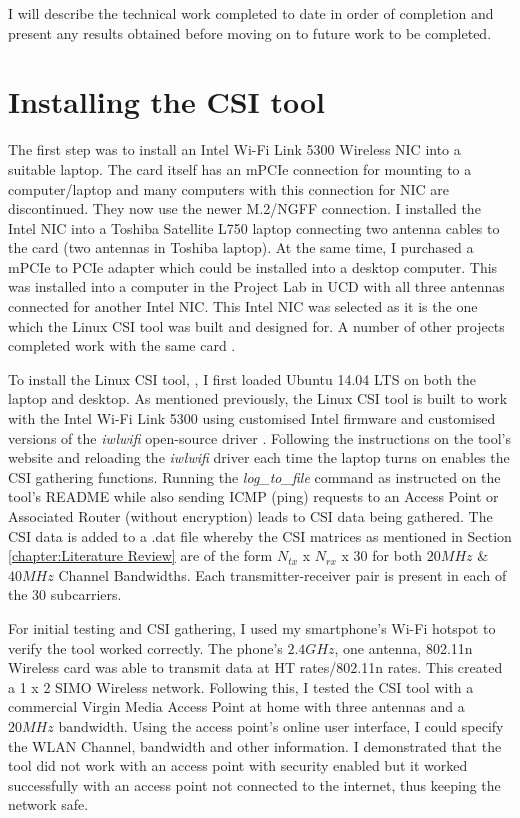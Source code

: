 I will describe the technical work completed to date in order of completion and present any results obtained before moving on to future work to be completed. 
\section{Installing the CSI tool}
The first step was to install an Intel Wi-Fi Link 5300 Wireless NIC into a suitable laptop. The card itself has an mPCIe connection for mounting to a computer/laptop and many computers with this connection for NIC are discontinued. They now use the newer M.2/NGFF connection. I installed the Intel NIC into a Toshiba Satellite L750 laptop connecting two antenna cables to the card (two antennas in Toshiba laptop). At the same time, I purchased a mPCIe to PCIe adapter which could be installed into a desktop computer. This was installed into a computer in the Project Lab in UCD with all three antennas connected for another Intel NIC. This Intel NIC was selected as it is the one which the Linux CSI tool was built and designed for. A number of other projects completed work with the same card \citep{Halperin_csitool}. \par
To install the Linux CSI tool, \cite{Halperin_csitool}, I first loaded Ubuntu 14.04 LTS on both the laptop and desktop. As mentioned previously, the Linux CSI tool is built to work with the Intel Wi-Fi Link 5300 using customised Intel firmware and customised versions of the \textit{iwlwifi} open-source driver \citep{Halperin_csitool}. Following the instructions on the tool's website and reloading the \textit{iwlwifi} driver each time the laptop turns on enables the CSI gathering functions. Running the \textit{log\_to\_file} command as instructed on the tool's README while also sending ICMP (ping) requests to an Access Point or Associated Router (without encryption) leads to CSI data being gathered. The CSI data is added to a .dat file whereby the CSI matrices as mentioned in Section \ref{chapter:Literature Review} are of the form $N_{tx}$ x $N_{rx}$ x 30 for both $20MHz$ \& $40MHz$ Channel Bandwidths. Each transmitter-receiver pair is present in each of the 30 subcarriers. \par
For initial testing and CSI gathering, I used my smartphone's Wi-Fi hotspot to verify the tool worked correctly. The phone's $2.4GHz$, one antenna, 802.11n Wireless card was able to transmit data at HT rates/802.11n rates. This created a 1 x 2 SIMO Wireless network. Following this, I tested the CSI tool with a commercial Virgin Media Access Point at home with three antennas and a $20MHz$ bandwidth. Using the access point's online user interface, I could specify the WLAN Channel, bandwidth and other information. I demonstrated that the tool did not work with an access point with security enabled but it worked successfully with an access point not connected to the internet, thus keeping the network safe. \par 
